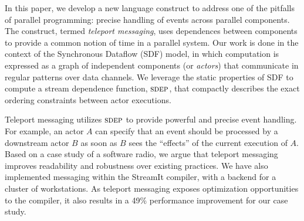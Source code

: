 In this paper, we develop a new language construct to address one of
the pitfalls of parallel programming: precise handling of events
across parallel components.  The construct, termed {\it teleport
messaging}, uses dependences between components to provide a common
notion of time in a parallel system.  Our work is done in the context
of the Synchronous Dataflow (SDF) model, in which computation is
expressed as a graph of independent components (or {\it actors}) that
communicate in regular patterns over data channels.  We leverage the
static properties of SDF to compute a stream dependence function,
$\textsc{sdep}$, that compactly describes the exact ordering constraints
between actor executions.

Teleport messaging utilizes $\textsc{sdep}$ to provide powerful and precise
event handling.  For example, an actor $A$ can specify that an event
should be processed by a downstream actor $B$ as soon as $B$ sees the
``effects'' of the current execution of $A$.  Based on a case study of
a software radio, we argue that teleport messaging improves
readability and robustness over existing practices.  We have also
implemented messaging within the StreamIt compiler, with a backend for
a cluster of workstations.  As teleport messaging exposes optimization
opportunities to the compiler, it also results in a 49\% performance
improvement for our case study.
